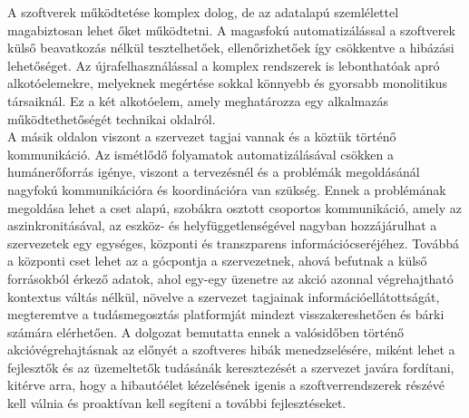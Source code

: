 A szoftverek működtetése komplex dolog, de az adatalapú szemlélettel magabiztosan lehet őket működtetni. A magasfokú automatizálással a szoftverek külső beavatkozás nélkül tesztelhetőek, ellenőrizhetőek így csökkentve a hibázási lehetőséget. Az újrafelhasználással a komplex rendszerek is lebonthatóak apró alkotóelemekre, melyeknek megértése sokkal könnyebb és gyorsabb monolitikus társaiknál. Ez a két alkotóelem, amely meghatározza egy alkalmazás működtethetőségét technikai oldalról.\hfill\\
A másik oldalon viszont a szervezet tagjai vannak és a köztük történő kommunikáció. Az ismétlődő folyamatok automatizálásával csökken a humánerőforrás igénye, viszont a tervezésnél és a problémák megoldásánál nagyfokú kommunikációra és koordinációra van szükség. Ennek a problémának megoldása lehet a cset alapú, szobákra osztott csoportos kommunikáció, amely az aszinkronitásával, az eszköz- és helyfüggetlenségével nagyban hozzájárulhat a szervezetek egy egységes, központi és transzparens információcseréjéhez. Továbbá a központi cset lehet az a gócpontja a szervezetnek, ahová befutnak a külső forrásokból érkező adatok, ahol egy-egy üzenetre az akció azonnal végrehajtható kontextus váltás nélkül, növelve a szervezet tagjainak információellátottságát, megteremtve a tudásmegosztás platformját mindezt visszakereshetően és bárki számára elérhetően. A dolgozat bemutatta ennek a valósidőben történő akcióvégrehajtásnak az előnyét a szoftveres hibák menedzselésére, miként lehet a fejlesztők és az üzemeltetők tudásánák keresztezését a szervezet javára fordítani, kitérve arra, hogy a hibautóélet kézelésének igenis a szoftverrendszerek részévé kell válnia és proaktívan kell segíteni a további fejlesztéseket.




